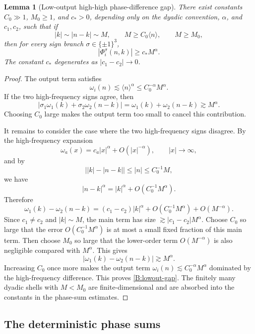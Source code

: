 \documentclass[10pt]{amsart}
\numberwithin{equation}{section}
\theoremstyle{plain}
\newtheorem{lemma}[theorem]{Lemma}
\theoremstyle{definition}
\theoremstyle{remark}
\newcommand{\la}{\langle}
\newcommand{\ra}{\rangle}
\begin{document}
\begin{lemma}[Low-output high-high phase-difference gap]\label{lem:B-lowout-gap}
There exist constants \(C_0\gg1\), \(M_0\ge1\), and \(c_*>0\), depending only on the dyadic convention, \(\alpha\), and \(c_1,c_2\), such that if
\[
        |k|\sim |n-k|\sim M,
        \qquad
        M\ge C_0\la n\ra,
        \qquad
        M\ge M_0,
\]
then for every sign branch \(\sigma\in\{\pm1\}^3\),
\begin{equation}\label{B:lowout-gap}
        |\Phi_i^\sigma(n,k)|\ge c_*M^\alpha.
\end{equation}
The constant \(c_*\) degenerates as \(|c_1-c_2|\to0\).
\end{lemma}

\begin{proof}
The output term satisfies
\[
        \omega_i(n)\lesssim\la n\ra^\alpha\le C_0^{-\alpha}M^\alpha.
\]
If the two high-frequency signs agree, then
\[
        |\sigma_1\omega_1(k)+\sigma_2\omega_2(n-k)|
        =
        \omega_1(k)+\omega_2(n-k)
        \gtrsim M^\alpha.
\]
Choosing \(C_0\) large makes the output term too small to cancel this contribution.

It remains to consider the case where the two high-frequency signs disagree.  By the high-frequency expansion
\[
        \omega_a(x)=c_a|x|^\alpha+O(|x|^{-\alpha}),
        \qquad |x|\to\infty,
\]
and by
\[
        \bigl||k|-|n-k|\bigr|\le |n|\le C_0^{-1}M,
\]
we have
\[
        |n-k|^\alpha=|k|^\alpha+O(C_0^{-1}M^\alpha).
\]
Therefore
\[
        \omega_1(k)-\omega_2(n-k)
        =
        (c_1-c_2)|k|^\alpha+O(C_0^{-1}M^\alpha)+O(M^{-\alpha}).
\]
Since \(c_1\ne c_2\) and \(|k|\sim M\), the main term has size \(\gtrsim |c_1-c_2|M^\alpha\).  Choose \(C_0\) so large that the error \(O(C_0^{-1}M^\alpha)\) is at most a small fixed fraction of this main term.  Then choose \(M_0\) so large that the lower-order term \(O(M^{-\alpha})\) is also negligible compared with \(M^\alpha\).  This gives
\[
        |\omega_1(k)-\omega_2(n-k)|\gtrsim M^\alpha.
\]
Increasing \(C_0\) once more makes the output term \(\omega_i(n)\lesssim C_0^{-\alpha}M^\alpha\) dominated by the high-frequency difference.  This proves \eqref{B:lowout-gap}.  The finitely many dyadic shells with \(M<M_0\) are finite-dimensional and are absorbed into the constants in the phase-sum estimates.
\end{proof}


\subsection{The deterministic phase sums}
\end{document}
